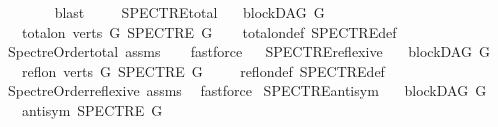 \begin{isabellebody}
\ \ \ \ \ \ \isamarkupfalse%
\ blast\ \isanewline
\ \ \isamarkupfalse%
\isanewline
{}\isamarkupfalse%
%
\endisatagproof
{\isafoldproof}%
%
\isadelimproof
\isanewline
%
\endisadelimproof
\isanewline
{}\isamarkupfalse%
\ SPECTRE{\isacharunderscore}{\kern0pt}total{\isacharcolon}{\kern0pt}\isanewline
\ \ \ {\isachardoublequoteopen}blockDAG\ G{\isachardoublequoteclose}\isanewline
\ \ \ {\isachardoublequoteopen}total{\isacharunderscore}{\kern0pt}on\ {\isacharparenleft}{\kern0pt}verts\ G{\isacharparenright}{\kern0pt}\ {\isacharparenleft}{\kern0pt}SPECTRE\ G{\isacharparenright}{\kern0pt}{\isachardoublequoteclose}\isanewline
%
\isadelimproof
\ \ %
\endisadelimproof
%
\isatagproof
{}\isamarkupfalse%
\ total{\isacharunderscore}{\kern0pt}on{\isacharunderscore}{\kern0pt}def\ SPECTRE{\isacharunderscore}{\kern0pt}def\ \isanewline
\ \ \isamarkupfalse%
\ Spectre{\isacharunderscore}{\kern0pt}Order{\isacharunderscore}{\kern0pt}total\ assms\isanewline
\ \ \isamarkupfalse%
\ fastforce%
\endisatagproof
{\isafoldproof}%
%
\isadelimproof
\ \isanewline
%
\endisadelimproof
\isanewline
{}\isamarkupfalse%
\ SPECTRE{\isacharunderscore}{\kern0pt}reflexive{\isacharcolon}{\kern0pt}\isanewline
\ \ \ {\isachardoublequoteopen}blockDAG\ G{\isachardoublequoteclose}\isanewline
\ \ \ {\isachardoublequoteopen}refl{\isacharunderscore}{\kern0pt}on\ {\isacharparenleft}{\kern0pt}verts\ G{\isacharparenright}{\kern0pt}\ {\isacharparenleft}{\kern0pt}SPECTRE\ G{\isacharparenright}{\kern0pt}{\isachardoublequoteclose}\ \isanewline
%
\isadelimproof
\ \ %
\endisadelimproof
%
\isatagproof
{}\isamarkupfalse%
\ refl{\isacharunderscore}{\kern0pt}on{\isacharunderscore}{\kern0pt}def\ SPECTRE{\isacharunderscore}{\kern0pt}def\ \isanewline
\ \ \isamarkupfalse%
\ Spectre{\isacharunderscore}{\kern0pt}Order{\isacharunderscore}{\kern0pt}reflexive\ assms\ \isamarkupfalse%
\ fastforce%
\endisatagproof
{\isafoldproof}%
%
\isadelimproof
\isanewline
%
\endisadelimproof
\isanewline
{}\isamarkupfalse%
\ SPECTRE{\isacharunderscore}{\kern0pt}antisym{\isacharcolon}{\kern0pt}\isanewline
\ \ \ {\isachardoublequoteopen}blockDAG\ G{\isachardoublequoteclose}\isanewline
\ \ \ {\isachardoublequoteopen}antisym\ {\isacharparenleft}{\kern0pt}SPECTRE\ G{\isacharparenright}{\kern0pt}{\isachardoublequoteclose}\ \isanewline
%
\isadelimproof

\end{isabellebody}
